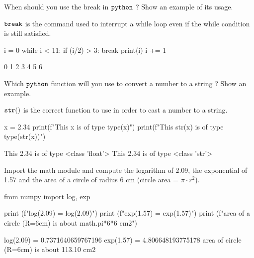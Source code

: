 \begin{question}
When should you use the break in \(\tt{python}\) ? Show an example of its usage.
\end{question}

\cprotEnv \begin{solution}
\(\tt{break}\) is the command used to interrupt a while loop even if the while condition is still satisfied.

\begin{ipython}
i = 0
while i < 11:
    if (i/2) > 3:
        break
    print(i)
    i += 1 
\end{ipython}
\begin{ioutput}    
0
1
2
3
4
5
6
\end{ioutput}
\end{solution}

\begin{question}
Which \(\tt{python}\) function will you use to convert a number to a string ? Show an example.
\end{question}

\cprotEnv \begin{solution}
\(\tt{str()}\) is the correct function to use in order to cast a number to a string.

\begin{ipython}
x = 2.34
print(f"This {x} is of type {type(x)}")
print(f"This {str(x)} is of type {type(str(x))}")
\end{ipython}
\begin{ioutput}    
This 2.34 is of type <class 'float'>
This 2.34 is of type <class 'str'>
\end{ioutput}
\end{solution}

\begin{question}
Import the math module and compute the logarithm of 2.09, the exponential of 1.57 and the area of a circle of radius 6 cm (circle area = $\pi \cdot r^2$).
\end{question}

\cprotEnv \begin{solution}
\begin{ipython}
from numpy import log, exp

print (f"log(2.09) = {log(2.09)}")
print (f"exp(1.57) = {exp(1.57)}")
print (f"area of a circle (R=6cm) is about {math.pi*6*6} cm2")
\end{ipython}
\begin{ioutput}    
log(2.09) = 0.7371640659767196
exp(1.57) = 4.806648193775178
area of circle (R=6cm) is about 113.10 cm2
\end{ioutput}
\end{solution}

